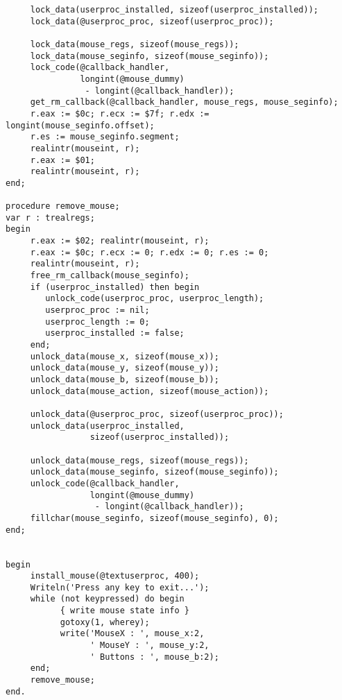 \begin{FPCList}
\begin{verbatim}
     lock_data(userproc_installed, sizeof(userproc_installed));
     lock_data(@userproc_proc, sizeof(userproc_proc));

     lock_data(mouse_regs, sizeof(mouse_regs));
     lock_data(mouse_seginfo, sizeof(mouse_seginfo));
     lock_code(@callback_handler, 
               longint(@mouse_dummy) 
                - longint(@callback_handler));
     get_rm_callback(@callback_handler, mouse_regs, mouse_seginfo);
     r.eax := $0c; r.ecx := $7f; r.edx := longint(mouse_seginfo.offset);
     r.es := mouse_seginfo.segment;
     realintr(mouseint, r);
     r.eax := $01;
     realintr(mouseint, r);
end;

procedure remove_mouse;
var r : trealregs;
begin
     r.eax := $02; realintr(mouseint, r);
     r.eax := $0c; r.ecx := 0; r.edx := 0; r.es := 0;
     realintr(mouseint, r);
     free_rm_callback(mouse_seginfo);
     if (userproc_installed) then begin
        unlock_code(userproc_proc, userproc_length);
        userproc_proc := nil;
        userproc_length := 0;
        userproc_installed := false;
     end;
     unlock_data(mouse_x, sizeof(mouse_x));
     unlock_data(mouse_y, sizeof(mouse_y));
     unlock_data(mouse_b, sizeof(mouse_b));
     unlock_data(mouse_action, sizeof(mouse_action));

     unlock_data(@userproc_proc, sizeof(userproc_proc));
     unlock_data(userproc_installed, 
                 sizeof(userproc_installed));

     unlock_data(mouse_regs, sizeof(mouse_regs));
     unlock_data(mouse_seginfo, sizeof(mouse_seginfo));
     unlock_code(@callback_handler, 
                 longint(@mouse_dummy)
                  - longint(@callback_handler));
     fillchar(mouse_seginfo, sizeof(mouse_seginfo), 0);
end;


begin
     install_mouse(@textuserproc, 400);
     Writeln('Press any key to exit...');
     while (not keypressed) do begin
           { write mouse state info }
           gotoxy(1, wherey);
           write('MouseX : ', mouse_x:2, 
                 ' MouseY : ', mouse_y:2, 
                 ' Buttons : ', mouse_b:2);
     end;
     remove_mouse;
end.\end{verbatim}
\end{FPCList}